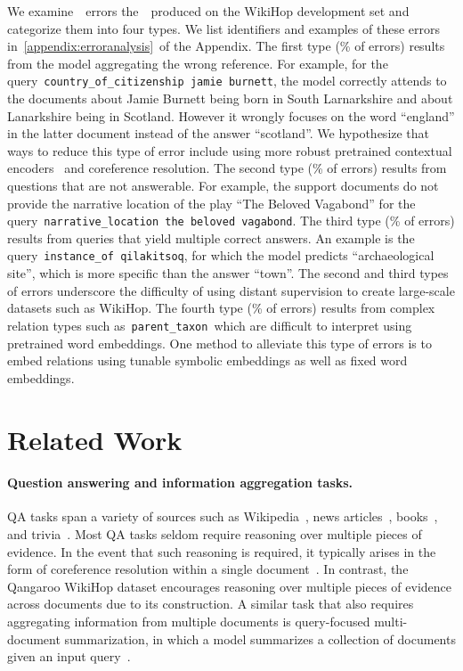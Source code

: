 \documentclass{article} \usepackage{iclr2019_conference,times}
\begin{document}
We examine~\errortotal~errors the~\modelnameshort~produced on the WikiHop development set and categorize them into four types.
We list identifiers and examples of these errors in~\ref{appendix:erroranalysis}~of the Appendix.
The first type (\errorref\% of errors) results from the model aggregating the wrong reference.
For example, for the query~\texttt{country\_of\_citizenship jamie burnett}, 
the model correctly attends to the documents about Jamie Burnett being born in South Larnarkshire and about Lanarkshire being in Scotland.
However it wrongly focuses on the word ``england'' in the latter document instead of the answer ``scotland''.
We hypothesize that ways to reduce this type of error include using more robust pretrained contextual encoders~\citep{McCann2017Learned,peters2018deep} and coreference resolution.
The second type (\errorunanswerable\% of errors) results from questions that are not answerable.
For example, the support documents do not provide the narrative location of the play ``The Beloved Vagabond'' for the query~\texttt{narrative\_location the beloved vagabond}.
The third type (\errormulti\% of errors) results from queries that yield multiple correct answers.
An example is the query~\texttt{instance\_of qilakitsoq}, for which the model predicts ``archaeological site'', which is more specific than the answer ``town''.
The second and third types of errors underscore the difficulty of using distant supervision to create large-scale datasets such as WikiHop.
The fourth type (\errorrel\% of errors) results from complex relation types such as~\texttt{parent\_taxon}~which are difficult to interpret using pretrained word embeddings.
One method to alleviate this type of errors is to embed relations using tunable symbolic embeddings as well as fixed word embeddings.


\section{Related Work}

\paragraph{Question answering and information aggregation tasks.}
QA tasks span a variety of sources such as
Wikipedia~\citep{yang2015wikiqa,Rajpurkar2016SQuAD10,Rajpurkar2018SQuAD20,hewlett2016wikireading,Joshi2017TriviaQA,welbl2018constructing},
news articles~\citep{hermann2015teaching,trischler2017newsqa},
books~\citep{richardson2013mctest},
and trivia~\citep{iyyer2014ANeural}.
Most QA tasks seldom require reasoning over multiple pieces of evidence.
In the event that such reasoning is required, it typically arises in the form of coreference resolution within a single document~\citep{min2018efficient}.
In contrast, the Qangaroo WikiHop dataset encourages reasoning over multiple pieces of evidence across documents due to its construction.
A similar task that also requires aggregating information from multiple documents is query-focused multi-document summarization, in which a model summarizes a collection of documents given an input query~\citep{hoa2006overview,gupta2007measuring,wang2013sentence}.
\end{document}

